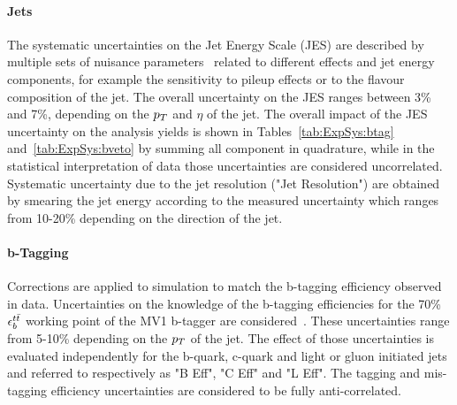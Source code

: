 \paragraph{Jets}
The systematic uncertainties on the Jet Energy Scale (JES) are described by multiple sets of nuisance parameters~\cite{JES}
related to different effects and jet energy components, for example the sensitivity to pileup effects or
to the flavour composition of the jet. The overall uncertainty on the JES ranges 
between 3\% and 7\%, depending on the $p_{T}$ and $\eta$ of the jet. 
The overall impact of the JES uncertainty on the analysis yields is shown in Tables~\ref{tab:ExpSys:btag} and~\ref{tab:ExpSys:bveto}
by summing all component in quadrature, while in the statistical interpretation of data
those uncertainties are considered uncorrelated.
Systematic uncertainty due to the jet resolution ("Jet Resolution") are obtained by smearing the jet energy 
according to the measured  uncertainty which ranges from 10-20\% depending on the direction of the jet.

\paragraph{b-Tagging}  Corrections are applied to simulation
to match the b-tagging efficiency observed  in data. Uncertainties on the knowledge 
of the b-tagging efficiencies for the 70\% $\epsilon_b^{t\bar{t}}$ working point of the MV1 b-tagger are
considered~\cite{BtaggingScaleFactors,BtaggingScaleFactorsNew}. These uncertainties range from 5-10\%  depending on the $p_{T}$ of the jet. 
The effect of those uncertainties is evaluated independently for the
 b-quark, c-quark and light or gluon initiated jets and referred to respectively 
 as "B  Eff", "C Eff" and "L Eff". The tagging and mis-tagging efficiency uncertainties 
 are considered to be fully anti-correlated. 

